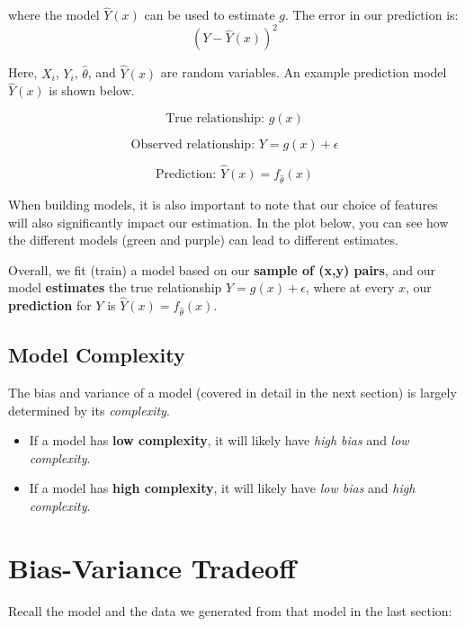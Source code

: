 \documentclass[
  letterpaper,
  DIV=11,
  numbers=noendperiod]{scrreprt}
\providecommand{\tightlist}{%
  \setlength{\itemsep}{0pt}\setlength{\parskip}{0pt}}\usepackage{longtable,booktabs,array}
\begin{document}
where the model \(\hat{Y}(x)\) can be used to estimate \(g\). The error
in our prediction is: \[ (Y-\hat{Y}(x))^2\]

Here, \(X_i\), \(Y_i\), \(\hat{\theta}\), and \(\hat{Y}(x)\) are random
variables. An example prediction model \(\hat{Y}(x)\) is shown below.

\[\text{True relationship: } g(x)\]

\[\text{Observed relationship: }Y = g(x) + \epsilon\]

\[\text{Prediction: }\hat{Y}(x) = f_{\hat{\theta}}(x)\]

When building models, it is also important to note that our choice of
features will also significantly impact our estimation. In the plot
below, you can see how the different models (green and purple) can lead
to different estimates.

Overall, we fit (train) a model based on our \textbf{sample of (x,y)
pairs}, and our model \textbf{estimates} the true relationship
\(Y=g(x)+\epsilon\), where at every \(x\), our \textbf{prediction} for
\(Y\) is \(\hat{Y}(x) = f_{\hat{\theta}}(x)\).

\subsection{Model Complexity}\label{model-complexity}

The bias and variance of a model (covered in detail in the next section)
is largely determined by its \emph{complexity}.

\begin{itemize}
\tightlist
\item
  If a model has \textbf{low complexity}, it will likely have \emph{high
  bias} and \emph{low complexity}.
\end{itemize}

\begin{itemize}
\tightlist
\item
  If a model has \textbf{high complexity}, it will likely have \emph{low
  bias} and \emph{high complexity}.
\end{itemize}

\section{Bias-Variance Tradeoff}\label{sec-bias-variance-tradeoff}

Recall the model and the data we generated from that model in the last
section:
\end{document}
